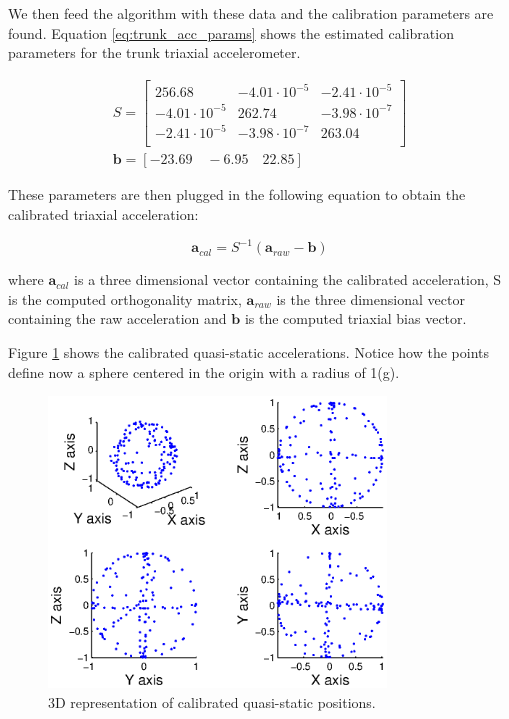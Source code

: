 We then feed the algorithm with these data and the calibration parameters are found. Equation \ref{eq:trunk_acc_params} shows the estimated calibration parameters for the trunk triaxial accelerometer.

\begin{gather}
\label{eq:trunk_acc_params}
S = \left[\begin{array}{ccc}
		256.68 						& -4.01\cdot10^{-5} & -2.41\cdot10^{-5} \\
		-4.01\cdot10^{-5}	&	262.74						&	-3.98\cdot10^{-7} \\
		-2.41\cdot10^{-5}	& -3.98\cdot10^{-7}	& 263.04 \\
		\end{array}\right] \\ \nonumber
\mathbf{b} = \left[-23.69\quad -6.95\quad 22.85\right]
\end{gather}

These parameters are then plugged in the following equation to obtain the calibrated triaxial acceleration:

\begin{equation}
\label{eq:cal_acceleration}
\mathbf{a}_{cal}=S^{-1}(\mathbf{a}_{raw}-\mathbf{b})
\end{equation}

where $\mathbf{a}_{cal}$ is a three dimensional vector containing the calibrated acceleration, S is the computed orthogonality matrix, $\mathbf{a}_{raw}$ is the three dimensional vector containing the raw acceleration and $\mathbf{b}$ is the computed triaxial bias vector.

Figure \ref{fig:acc_multiposition_cal_3D_4POV} shows the calibrated quasi-static accelerations. Notice how the points define now a sphere centered in the origin with a radius of 1(g).

\begin{figure}[H]
\centering
\includegraphics[width=0.8\textwidth]{figures/acc_multiposition_cal_3D_4POV.eps}
\caption{3D representation of calibrated quasi-static positions.}
\label{fig:acc_multiposition_cal_3D_4POV}
\end{figure}

